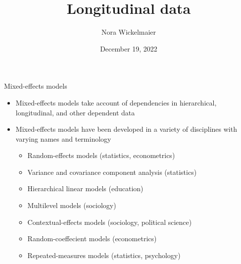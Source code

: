 \documentclass[aspectratio=169]{beamer}
\title{Longitudinal data}
\author{Nora Wickelmaier}
\date{December 19, 2022}
\begin{document}
\begin{frame}{}
\thispagestyle{empty}
\titlepage
\end{frame}



\begin{frame}{Mixed-effects models}
\begin{itemize}
  \item Mixed-effects models take account of dependencies in hierarchical,
    longitudinal, and other dependent data
  \item Mixed-effects models have been developed in a variety of
    disciplines with varying names and terminology
  \begin{itemize}
    \item Random-effects models (statistics, econometrics)
    \item Variance and covariance component analysis (statistics)
    \item Hierarchical linear models (education)
    \item Multilevel models (sociology)
    \item Contextual-effects models (sociology, political science)
    \item Random-coeffecient models (econometrics)
    \item Repeated-measures models (statistics, psychology)
  \end{itemize}
\end{itemize}
  \begin{flushright}{\footnotesize \citet{Fox2016}}\end{flushright}
\end{frame}


% 
% 
\end{document}
